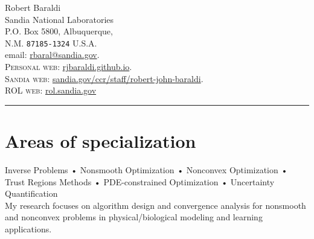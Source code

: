 \documentclass[10pt, a4paper]{article}
\begin{document}
{\LARGE Robert Baraldi}\\%
Sandia National Laboratories\\
P.O. Box 5800, Albuquerque,\\
N.M. \texttt{87185-1324}
U.S.A.\\
email: \href{mailto:rbaral@sandia.gov}{rbaral@sandia.gov}.\\
\textsc{Personal web}: \href{http://rjbaraldi.github.io}{rjbaraldi.github.io}.\\
\textsc{Sandia web}: \href{https://www.sandia.gov/ccr/staff/robert-john-baraldi/}{sandia.gov/ccr/staff/robert-john-baraldi}.\\
\textsc{ROL web}: \href{https://rol.sandia.gov/}{rol.sandia.gov}

\hrule
\section*{Areas of specialization}
 Inverse Problems • Nonsmooth Optimization • Nonconvex Optimization • Trust Regions Methods • PDE-constrained Optimization • Uncertainty Quantification\\
 My research focuses on algorithm design and convergence analysis for nonsmooth and nonconvex problems in physical/biological modeling and learning applications.
\end{document}
